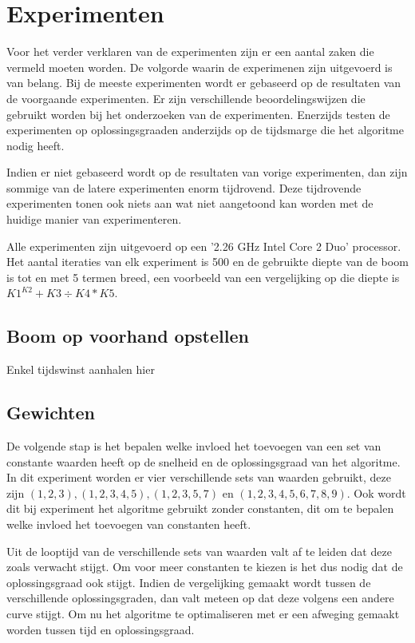 \documentclass[Main.tex]{subfiles}
\begin{document}
\section{Experimenten}
Voor het verder verklaren van de experimenten zijn er een aantal zaken die vermeld moeten worden. De volgorde waarin de experimenen zijn uitgevoerd is van belang. Bij de meeste experimenten wordt er gebaseerd op de resultaten van de voorgaande experimenten. Er zijn verschillende beoordelingswijzen die gebruikt worden bij het onderzoeken van de experimenten. Enerzijds testen de experimenten op oplossingsgraad\footnotemark[\ref{note:oplossingsgraad}] en anderzijds op de tijdsmarge die het algoritme nodig heeft. 
\par
Indien er niet gebaseerd wordt op de resultaten van vorige experimenten, dan zijn sommige van de latere experimenten enorm tijdrovend. Deze tijdrovende experimenten tonen ook niets aan wat niet aangetoond kan worden met de huidige manier van experimenteren.
\par
Alle experimenten zijn uitgevoerd op een '2.26 GHz Intel Core 2 Duo' processor. Het aantal iteraties van elk experiment is 500 en de gebruikte diepte van de boom is tot en met 5 termen breed, een voorbeeld van een vergelijking op die diepte is $K1^{K2}+K3 \div K4*K5$.

\subsection{Boom op voorhand opstellen}

Enkel tijdswinst aanhalen hier %

\subsection{Gewichten}
De volgende stap is het bepalen welke invloed het toevoegen van een set van constante waarden heeft op de snelheid en de oplossingsgraad van het algoritme. In dit experiment worden er vier verschillende sets van waarden gebruikt, deze zijn $(1,2,3), (1,2,3,4,5), (1,2,3,5,7)$ en $(1,2,3,4,5,6,7,8,9)$. Ook wordt dit bij experiment het algoritme gebruikt zonder constanten, dit om te bepalen welke invloed het toevoegen van constanten heeft.

Uit de looptijd van de verschillende sets van waarden valt af te leiden dat deze zoals verwacht stijgt. Om voor meer constanten te kiezen is het dus nodig dat de oplossingsgraad ook stijgt. Indien de vergelijking gemaakt wordt tussen de verschillende oplossingsgraden, dan valt meteen op dat deze volgens een andere curve stijgt. Om nu het algoritme te optimaliseren met er een afweging gemaakt worden tussen tijd en oplossingsgraad. 
\end{document}
